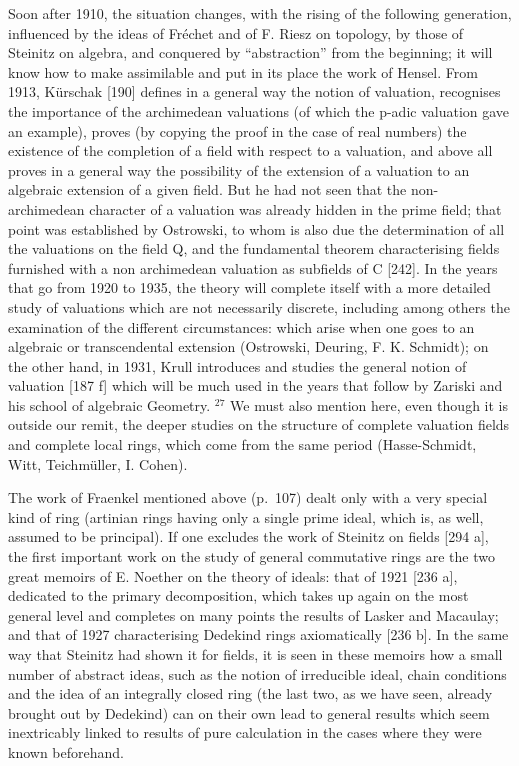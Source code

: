 Soon after 1910, the situation changes, with the rising of the following generation, influenced by the ideas of Fréchet and of F. Riesz on topology, by those of Steinitz on algebra, and conquered by ``abstraction'' from the beginning; it will know how to make assimilable and put in its place the work of Hensel. From 1913, Kürschak {[}190{]} defines in a general way the notion of valuation, recognises the importance of the archimedean valuations (of which the p-adic valuation gave an example), proves (by copying the proof in the case of real numbers) the existence of the completion of a field with respect to a valuation, and above all proves in a general way the possibility of the extension of a valuation to an algebraic extension of a given field. But he had not seen that the non-archimedean character of a valuation was already hidden in the prime field; that point was established by Ostrowski, to whom is also due the determination of all the valuations on the field Q, and the fundamental theorem characterising fields furnished with a non archimedean valuation as subfields of C {[}242{]}. In the years that go from 1920 to 1935, the theory will complete itself with a more detailed study of valuations which are not necessarily discrete, including among others the examination of the different circumstances: which arise when one goes to an algebraic or transcendental extension (Ostrowski, Deuring, F. K. Schmidt); on the other hand, in 1931, Krull introduces and studies the general notion of valuation {[}187 f{]} which will be much used in the years that follow by Zariski and his school of algebraic Geometry. \(^{27}\) We must also mention here, even though it is outside our remit, the deeper studies on the structure of complete valuation fields and complete local rings, which come from the same period (Hasse-Schmidt, Witt, Teichmüller, I. Cohen).

The work of Fraenkel mentioned above (p.~107) dealt only with a very special kind of ring (artinian rings having only a single prime ideal, which is, as well, assumed to be principal). If one excludes the work of Steinitz on fields {[}294 a{]}, the first important work on the study of general commutative rings are the two great memoirs of E. Noether on the theory of ideals: that of 1921 {[}236 a{]}, dedicated to the primary decomposition, which takes up again on the most general level and completes on many points the results of Lasker and Macaulay; and that of 1927 characterising Dedekind rings axiomatically {[}236 b{]}. In the same way that Steinitz had shown it for fields, it is seen in these memoirs how a small number of abstract ideas, such as the notion of irreducible ideal, chain conditions and the idea of an integrally closed ring (the last two, as we have seen, already brought out by Dedekind) can on their own lead to general results which seem inextricably linked to results of pure calculation in the cases where they were known beforehand.

